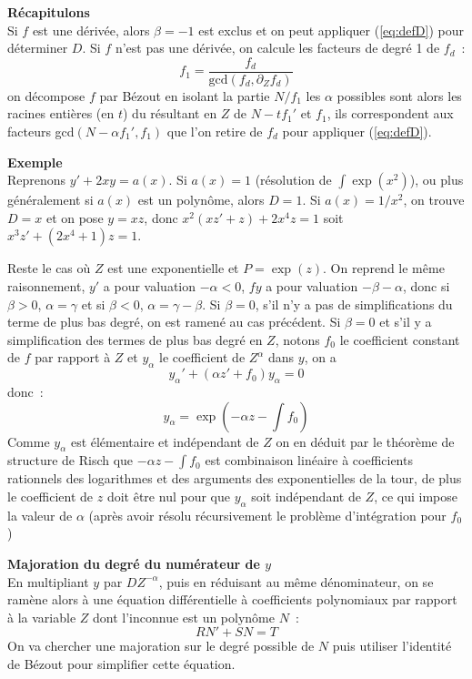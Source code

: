 \documentclass[a4paper,11pt]{article}
\begin{document}
\begin{giacjshere}
{\bf Récapitulons}\\
Si $f$ est une dérivée, alors $\beta=-1$ est exclus et on peut
appliquer (\ref{eq:defD}) pour déterminer $D$. Si $f$ n'est
pas une dérivée, on calcule les facteurs de degré 1 de $f_d$~:
\[ f_1=\frac{f_d}{\mbox{gcd}(f_d,\partial_Z f_d)} \]
on décompose $f$ par Bézout en isolant la partie $N/f_1$
les $\alpha$ possibles sont alors les racines entières (en $t$)
du résultant en $Z$ de $N-tf_1'$ et $f_1$, ils correspondent aux
facteurs gcd$(N-\alpha f_1',f_1)$ que l'on retire de $f_d$ pour
appliquer (\ref{eq:defD}).

{\bf Exemple}\\
Reprenons $y'+2xy=a(x)$. Si $a(x)=1$ (résolution de $\int \exp(x^2)$),
ou plus généralement si $a(x)$ est un polynôme,
alors $D=1$. Si $a(x)=1/x^2$, on trouve $D=x$ et on pose $y=xz$,
donc $x^2(xz'+z)+2x^4z=1$ soit $x^3z'+(2x^4+1)z=1$.

Reste le cas o\`u $Z$ est une exponentielle et $P=\exp(z)$. On reprend
le m\^eme raisonnement, $y'$ a pour valuation $-\alpha<0$, $fy$ a pour
valuation $-\beta-\alpha$, donc si $\beta > 0$,
$\alpha=\gamma$ et si $\beta<0$, $\alpha=\gamma-\beta$.
Si $\beta=0$, s'il n'y a pas de simplifications du terme de plus bas
degr\'e, on est ramen\'e au cas pr\'ec\'edent. 
Si $\beta=0$ et s'il y a simplification des termes de plus
bas degr\'e en $Z$, notons $f_0$ le coefficient constant de $f$ 
par rapport \`a $Z$ et $y_{\alpha}$ le coefficient de $Z^{\alpha}$
dans $y$, on a 
\[ y_\alpha ' + (\alpha z' + f_0) y_\alpha =0 \]
donc~:
\[ y_\alpha= \exp(-\alpha z-\int f_0)\]
Comme $y_\alpha$ est \'el\'ementaire et ind\'ependant de $Z$
on en d\'eduit par le th\'eor\`eme de structure de Risch
que $-\alpha z -\int f_0$ est combinaison lin\'eaire \`a coefficients
rationnels des logarithmes et des arguments des exponentielles de la tour,
de plus le coefficient de $z$ doit \^etre nul pour que $y_\alpha$ soit
ind\'ependant de $Z$, ce qui impose la valeur de $\alpha$ (apr\`es avoir
r\'esolu r\'ecursivement le probl\`eme d'int\'egration pour $f_0$)

{\bf Majoration du degr\'e du num\'erateur de $y$}\\
En multipliant $y$ par $D Z^{-\alpha}$, puis en réduisant au
même dénominateur,
on se ram\`ene alors à une équation différentielle à coefficients
polynomiaux par rapport \`a la variable $Z$ dont l'inconnue est un polynôme 
$N$~:
\begin{equation} \label{eq:rischdepol}
 R N' + S N = T
\end{equation}
On va chercher une majoration sur le degr\'e possible de $N$ puis
utiliser l'identit\'e de B\'ezout pour simplifier
cette \'equation. 


\end{giacjshere}
\end{document}
